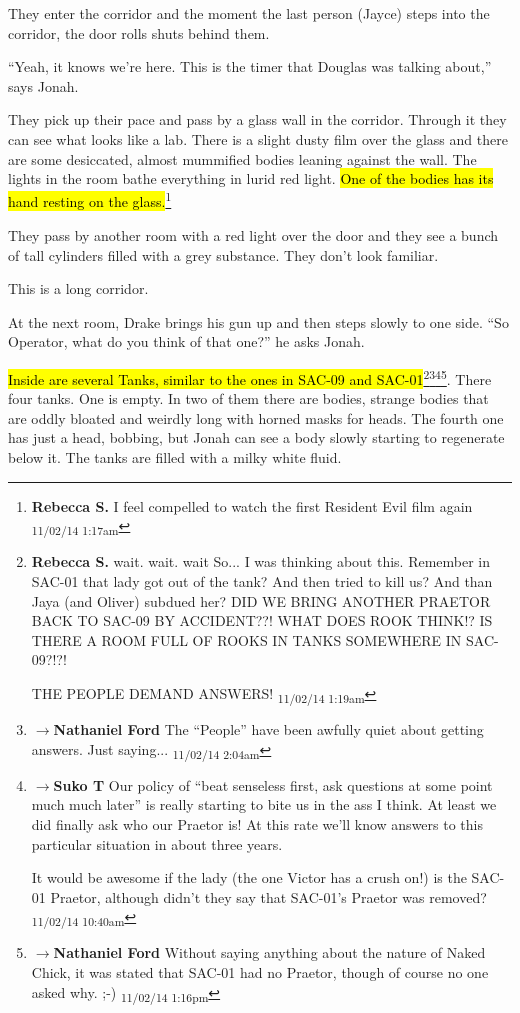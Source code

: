 
They enter the corridor and the moment the last person (Jayce) steps into the corridor, the door rolls shuts behind them.

``Yeah, it knows we're here.  This is the timer that Douglas was talking about,'' says Jonah.

They pick up their pace and pass by a glass wall in the corridor.  Through it they can see what looks like a lab.  There is a slight dusty film over the glass and there are some desiccated, almost mummified bodies leaning against the wall.  The lights in the room bathe everything in lurid red light.  \hl{One of the bodies has its hand resting on the glass.}\footnote{\textbf{Rebecca S. }I feel compelled to watch the first Resident Evil film again \textsubscript{11/02/14 1:17am}}

They pass by another room with a red light over the door and they see a bunch of tall cylinders filled with a grey substance.  They don't look familiar.

This is a long corridor.

At the next room, Drake brings his gun up and then steps slowly to one side.   ``So Operator, what do you think of that one?'' he asks Jonah.

\hl{Inside are several Tanks, similar to the ones in SAC-09 and SAC-01}\footnote{\textbf{Rebecca S. }wait. wait. wait
So... I was thinking about this.
Remember in SAC-01 that lady got out of the tank? And then tried to kill us?  And than Jaya (and Oliver) subdued her?
DID WE BRING ANOTHER PRAETOR BACK TO SAC-09 BY ACCIDENT??!
WHAT DOES ROOK THINK!?
IS THERE A ROOM FULL OF ROOKS IN TANKS SOMEWHERE IN SAC-09?!?!

THE PEOPLE DEMAND ANSWERS! \textsubscript{11/02/14 1:19am}}\footnote{$\rightarrow$\textbf{Nathaniel Ford }The ``People'' have been awfully quiet about getting answers. Just saying... \textsubscript{11/02/14 2:04am}}\footnote{$\rightarrow$\textbf{Suko T }Our policy of ``beat senseless first, ask questions at some point much much later'' is really starting to bite us in the ass I think.  At least we did finally ask who our Praetor is!  At this rate we'll know answers to this particular situation in about three years.

It would be awesome if the lady (the one Victor has a crush on!) is the SAC-01 Praetor, although didn't they say that SAC-01's Praetor was removed? \textsubscript{11/02/14 10:40am}}\footnote{$\rightarrow$\textbf{Nathaniel Ford }Without saying anything about the nature of Naked Chick, it was stated that SAC-01 had no Praetor, though of course no one asked why. ;-) \textsubscript{11/02/14 1:16pm}}.  There four tanks.  One is empty.  In two of them there are bodies, strange bodies that are oddly bloated and weirdly long with horned masks for heads.  The fourth one has just a head, bobbing, but Jonah can see a body slowly starting to regenerate below it. The tanks are filled with a milky white fluid. 

